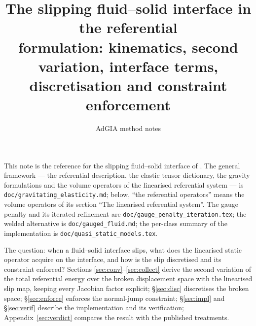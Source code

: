 \documentclass[11pt]{article}
\title{The slipping fluid--solid interface in the referential\\
       formulation: kinematics, second variation, interface terms,\\
       discretisation and constraint enforcement}
\author{AdGIA method notes}
\date{}
\begin{document}
\maketitle
\sloppy

\noindent
This note is the reference for the slipping fluid--solid interface of
\texttt{}. The
general framework --- the referential description, the elastic tensor
dictionary, the gravity formulations and the volume operators of the
linearised referential system --- is
\texttt{doc/gravitating\_elasticity.md}; below, ``the referential
operators'' means the volume operators of its section ``The linearised
referential system''. The gauge penalty and its iterated refinement are
\texttt{doc/gauge\_penalty\_iteration.tex}; the welded alternative is
\texttt{doc/gauged\_fluid.md}; the per-class summary of the
implementation is \texttt{doc/quasi\_static\_models.tex}.

The question: when a fluid--solid interface slips, what does the
linearised static operator acquire on the interface, and how is the
slip discretised and its constraint enforced? Sections
\ref{sec:conv}--\ref{sec:collect} derive the second variation of the
total referential energy over the broken displacement space with the
linearised slip map, keeping every Jacobian factor explicit;
\S\ref{sec:disc} discretises the broken space; \S\ref{sec:enforce}
enforces the normal-jump constraint; \S\ref{sec:impl} and
\S\ref{sec:verif} describe the implementation and its verification;
Appendix~\ref{sec:verdict} compares the result with the published
treatments.
\end{document}
